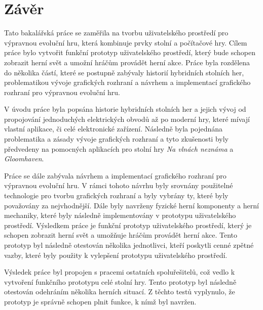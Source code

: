 \chapter{Závěr}
Tato bakalářská práce se zaměřila na tvorbu uživatelského prostředí pro výpravnou evoluční hru, která kombinuje prvky stolní a počítačové hry. Cílem práce bylo vytvořit funkční prototyp uživatelského prostředí, který bude schopen zobrazit herní svět a umožní hráčům provádět herní akce. Práce byla rozdělena do několika částí, které se postupně zabývaly historií hybridních stolních her, problematikou vývoje grafických rozhraní a návrhem a implementací grafického rozhraní pro výpravnou evoluční hru.

V úvodu práce byla popsána historie hybridních stolních her a jejich vývoj od propojování jednoduchých elektrických obvodů až po moderní hry, které mívají vlastní aplikace, či celé elektronické zařízení. Následně byla pojednána problematika a zásady vývoje grafických rozhraní a tyto zkušenosti byly předvedeny na pomocných aplikacích pro stolní hry \textit{Na vlnách neznáma} a \textit{Gloomhaven}.

Práce se dále zabývala návrhem a implementací grafického rozhraní pro výpravnou evoluční hru. V rámci tohoto návrhu byly srovnány použitelné technologie pro tvorbu grafických rozhraní a byly vybrány ty, které byly považovány za nejvhodnější. Dále byly navrženy fyzické herní komponenty a herní mechaniky, které byly následně implementovány v prototypu uživatelského prostředí. Výsledkem práce je funkční prototyp uživatelského prostředí, který je schopen zobrazit herní svět a umožňuje hráčům provádět herní akce. Tento prototyp byl následně otestován několika jednotlivci, kteří poskytli cenné zpětné vazby, které byly použity k vylepšení prototypu uživatelského prostředí.

Výsledek práce byl propojen s pracemi ostatních spoluřešitelů, což vedlo k vytvoření funkčního prototypu celé stolní hry. Tento prototyp byl následně otestován odehráním několika herních situací. Z těchto testů vyplynulo, že prototyp je správně schopen plnit funkce, k nímž byl navržen.
